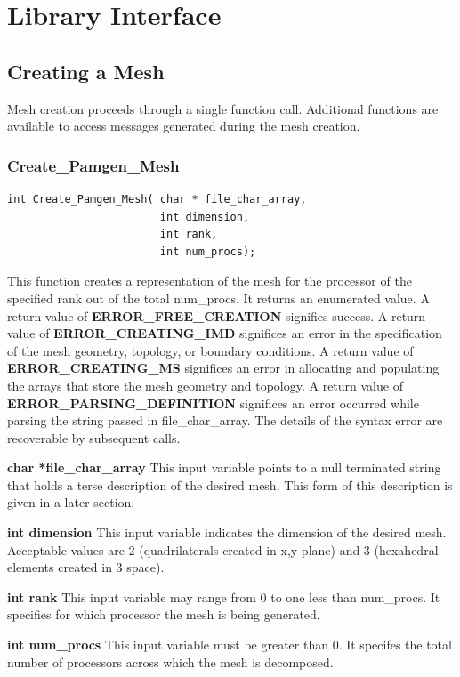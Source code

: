 \clearpage
\section{Library Interface}\label{sec:execution_steps}
\subsection{Creating a Mesh}
Mesh creation proceeds through a single function call. Additional functions are available to access messages generated during the mesh creation.
\subsubsection{Create\_Pamgen\_Mesh}
{\ttfamily  \begin{verbatim}
int Create_Pamgen_Mesh( char * file_char_array,
                        int dimension,
                        int rank,
                        int num_procs);
\end{verbatim}}
This function creates a representation of the mesh for the processor of the specified rank out of the total num\_procs. It returns an enumerated value. A return value of \textbf{ERROR\_FREE\_CREATION
} signifies success. A return value of \textbf{ERROR\_CREATING\_IMD} significes an error in the specification of the mesh geometry, topology, or boundary conditions. A return value of \textbf{ERROR\_CREATING\_MS} significes an error in allocating and populating the arrays that store the mesh geometry and topology. A return value of \textbf{ERROR\_PARSING\_DEFINITION} significes an error occurred while parsing the string passed in file\_char\_array. The details of the syntax error are recoverable by subsequent calls.

{
\setlength{\parindent}{0pt}

 \textbf{char *file\_char\_array}
This input variable points to a null terminated string that holds a terse description of the desired mesh.  This form of this description is given in a later section.

 \textbf{int dimension}
This input variable indicates the dimension of the desired mesh. Acceptable values are 2 (quadrilaterals created in x,y plane) and 3 (hexahedral elements created in 3 space).

 \textbf{int rank}
This input variable may range from 0 to one less than num\_procs. It specifies for which processor the mesh is being generated.

 \textbf{int num\_procs}
This input variable must be greater than 0.  It specifes the total number of processors across which the mesh is decomposed.
}
